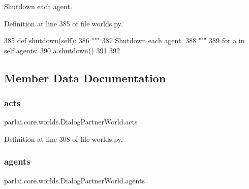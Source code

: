 \begin{DoxyVerb}Shutdown each agent.
\end{DoxyVerb}
 

Definition at line 385 of file worlds.\+py.


\begin{DoxyCode}
385     \textcolor{keyword}{def }shutdown(self):
386         \textcolor{stringliteral}{"""}
387 \textcolor{stringliteral}{        Shutdown each agent.}
388 \textcolor{stringliteral}{        """}
389         \textcolor{keywordflow}{for} a \textcolor{keywordflow}{in} self.agents:
390             a.shutdown()
391 
392 
\end{DoxyCode}


\subsection{Member Data Documentation}
\mbox{\label{classparlai_1_1core_1_1worlds_1_1DialogPartnerWorld_ab20044fc960066ca7e04bc4cf580a2be}} 
\subsubsection{\texorpdfstring{acts}{acts}}
{\footnotesize\ttfamily parlai.\+core.\+worlds.\+Dialog\+Partner\+World.\+acts}



Definition at line 308 of file worlds.\+py.

\mbox{\label{classparlai_1_1core_1_1worlds_1_1DialogPartnerWorld_a04185d1d55ca86c96c796f12f2226fc9}} 
\subsubsection{\texorpdfstring{agents}{agents}}
{\footnotesize\ttfamily parlai.\+core.\+worlds.\+Dialog\+Partner\+World.\+agents}



